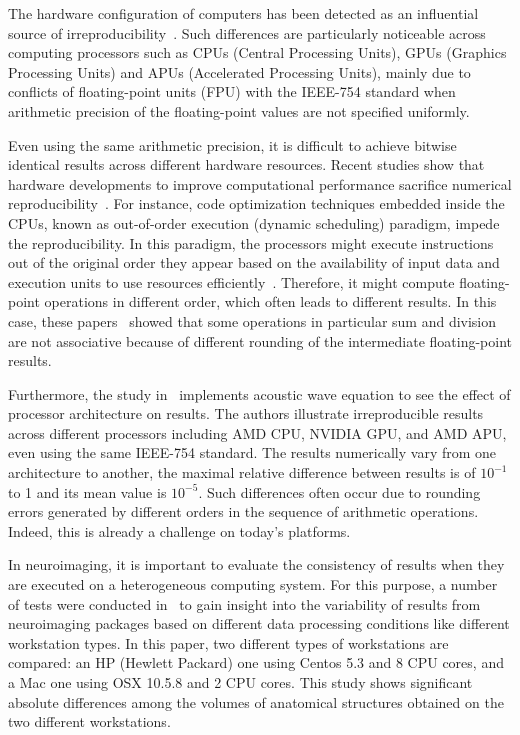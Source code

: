 The hardware configuration of computers has been detected as an 
influential source of irreproducibility~\cite{hill2017numerical}. Such 
differences are particularly noticeable across computing processors 
such as CPUs (Central Processing Units), GPUs (Graphics Processing 
Units) and APUs (Accelerated Processing Units), mainly due to conflicts 
of floating-point units (FPU) with the IEEE-754 standard when 
arithmetic precision of the floating-point values are not specified 
uniformly.

Even using the same arithmetic precision, it is difficult to achieve 
bitwise identical results across different hardware resources. 
Recent studies show that hardware developments to improve 
computational performance sacrifice numerical 
reproducibility~\cite{duben2014use, demmel2013numerical}. For instance, 
code optimization techniques embedded inside the CPUs, known as 
out-of-order execution (dynamic scheduling) paradigm, impede the 
reproducibility. In this paradigm, the processors might execute 
instructions out of the original order they appear based on the 
availability of input data and execution units to use resources 
efficiently~\cite{wiki2018out-of-order}. Therefore, it might compute 
floating-point operations in different order, which often leads to 
different results. In this case, 
these papers~\cite{duben2014use, demmel2013numerical} 
showed that some operations in 
particular sum and division are not associative because of different 
rounding of the intermediate floating-point results.

Furthermore, the study in~\cite{jezequel2015estimation} implements 
acoustic wave equation to see the effect of processor architecture on 
results. The authors illustrate irreproducible results across 
different processors including AMD CPU, NVIDIA GPU, and AMD APU, even 
using the same IEEE-754 standard. The results numerically vary from one 
architecture to another, the maximal relative difference between 
results is of $10^{-1}$ to 1 and its mean value is $10^{-5}$. Such 
differences often occur due to rounding errors generated by different 
orders in the sequence of arithmetic operations. Indeed, this is 
already a challenge on today's platforms. 

In neuroimaging, it is important to evaluate the consistency of  
results when they are executed on a heterogeneous computing system. For 
this purpose, a number of tests were conducted 
in~\cite{Gronenschild2012} to gain insight into the variability of  
results from neuroimaging packages based on different data processing 
conditions like different workstation types. In this paper, two 
different types of workstations are compared: an HP (Hewlett Packard) one 
using Centos 5.3 and 8 CPU cores, and a Mac one using OSX 10.5.8 and 2 
CPU cores. This study shows significant absolute differences among 
the volumes of anatomical structures obtained on the two different 
workstations. 



